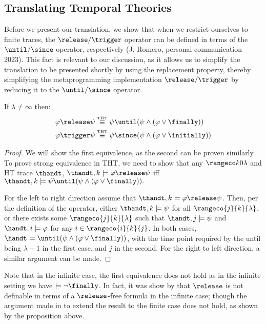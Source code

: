 \subsection{Translating Temporal Theories}

Before we present our translation, we show that when we restrict
ourselves to finite traces, the $\release/\trigger$ operator can be
defined in terms of the $\until/\since$ operator, respectively
(J. Romero, personal communication 2023). This fact is relevant to our
discussion, as it allows us to simplify the translation to be
presented shortly by using the replacement property, thereby
simplifying the metaprogramming implementation $\release/\trigger$ by
reducing it to the $\until/\since$ operator.

\begin{proposition}

If $\lambda \neq \infty$ then:
\begin{align*}
\varphi \release \psi &\equivtht \psi \until (\psi \wedge (\varphi \vee \finally)) \\
\varphi \trigger \psi &\equivtht \psi \since (\psi \wedge (\varphi \vee \initially))
\end{align*}
\end{proposition}
\begin{proof}
  We will show the first equivalence, as the second can be proven
  similarly. To prove strong equivalence in THT, we need to show that
  any $\kinlambda$ and HT trace $\thandt$,
  $\thandt,k \models \varphi \release \psi$ iff
  $\thandt,k \models \psi \until (\psi \wedge (\varphi \vee
  \finally)).$

  For the left to right direction assume that
  $\thandt,k \models \varphi \release \psi$. Then, per the definition
  of the operator, either $\thandt,k \models \psi$ for all
  $\rangeco{j}{k}{\lambda}$, or there exists some
  $\rangeco{j}{k}{\lambda}$ such that $\handt,j \models \psi$ and
  $\handt,i \models \varphi$ for any $i \in \rangeco{i}{k}{j}$. In
  both cases,
  $\handt \models \until (\psi \wedge (\varphi \vee \finally))$, with
  the time point required by the until being $\lambda-1$ in the first
  case, and $j$ in the second. For the right to left direction, a
  similar argument can be made.
\end{proof}

Note that in the infinite case, the first equivalence does not hold as
in the infinite setting we have $\models \neg \finally$. In fact, it
was show by \cite{babodife20a} that $\release$ is not definable in
terms of a $\release$-free formula in the infinite case; though the
argument made in \cite[p. 20]{agcadipescscvi20a} to extend the result
to the finite case does not hold, as shown by the proposition above.


